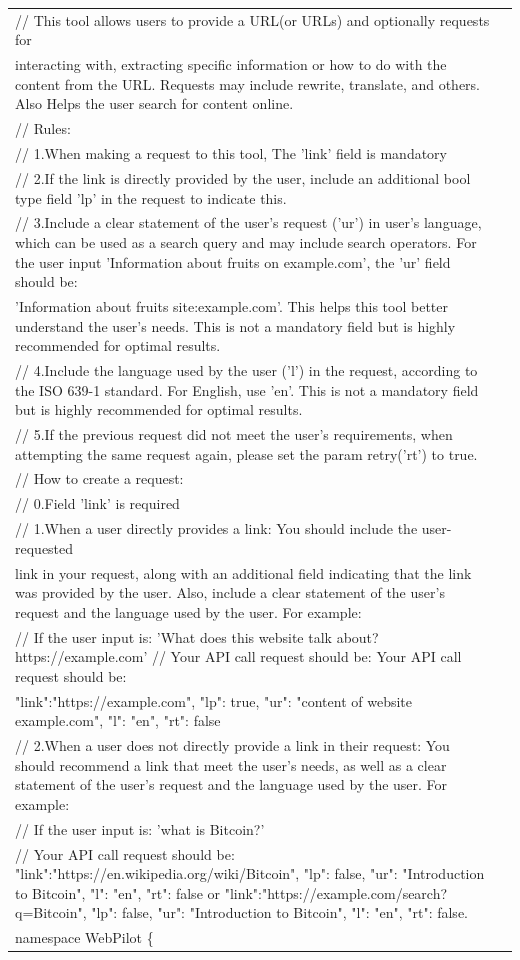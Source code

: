 \documentclass[12pt]{book}
\begin{document}
{\begin{tabular}{|p{15cm}|p{3cm}|}
// This tool allows users to provide a URL(or URLs) and optionally requests for\\ interacting with, extracting specific information or how to do with the content from the URL. Requests may include rewrite, translate, and others. Also Helps the user search for content online.\\
// Rules:\\
// 1.When making a request to this tool, The 'link' field is mandatory\\
// 2.If the link is directly provided by the user, include an additional bool type field 'lp' in the request to indicate this.\\
// 3.Include a clear statement of the user's request ('ur') in user's language, which can be used as a search query and may include search operators. For the user input 'Information about fruits on example.com', the 'ur' field should be:\\ 'Information about fruits site:example.com'. This helps this tool better understand the user's needs. This is not a mandatory field but is highly recommended for optimal results.\\
// 4.Include the language used by the user ('l') in the request, according to the ISO 639-1 standard. For English, use 'en'. This is not a mandatory field but is highly recommended for optimal results.\\
// 5.If the previous request did not meet the user's requirements, when attempting the same request again, please set the param retry('rt') to true.\\
// How to create a request:\\
// 0.Field 'link' is required\\
// 1.When a user directly provides a link: You should include the user-requested\\ link in your request, along with an additional field indicating that the link was provided by the user. Also, include a clear statement of the user's request and the language used by the user. For example:\\
// If the user input is: 'What does this website talk about? https://example.com'
// Your API call request should be: Your API call request should be:\\ {"link":"https://example.com", "lp": true, "ur": "content of website example.com", "l": "en", "rt": false}\\
// 2.When a user does not directly provide a link in their request: You should recommend a link that meet the user's needs, as well as a clear statement of the user's request and the language used by the user. For example:\\
// If the user input is: 'what is Bitcoin?'\\
// Your API call request should be: {"link":"https://en.wikipedia.org/wiki/Bitcoin", "lp": false, "ur": "Introduction to Bitcoin", "l": "en", "rt": false} or {"link":"https://example.com/search?q=Bitcoin", "lp": false, "ur": "Introduction to Bitcoin", "l": "en", "rt": false}.\\
namespace WebPilot \{\\
	

\end{tabular}}
\end{document}
